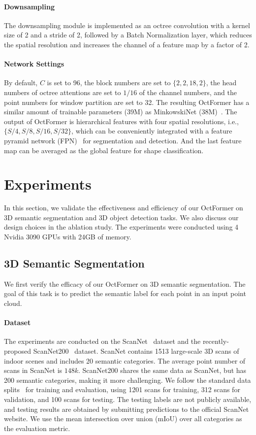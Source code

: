 \documentclass[acmtog,screen,authorversion]{acmart}
\begin{document}
\paragraph{Downsampling}
The downsampling module is implemented as an octree convolution with a kernel size of 2 and a stride of 2, followed by a Batch Normalization layer, which reduces the spatial resolution and increases the channel of a feature map by a factor of 2.

\paragraph{Network Settings}
By default, $C$ is set to 96, the block numbers are set to $\{2, 2, 18, 2\}$,  the head numbers of octree attentions are set to $1/16$ of the channel numbers, and the point numbers for window partition are set to 32.
The resulting OctFormer has a similar amount of trainable parameters (39M) as MinkowskiNet (38M)~\cite{Choy2019}.
The output of OctFormer is hierarchical features with four spatial resolutions, i.e., $\{ S/4, S/8, S/16, S/32 \}$, which can be conveniently integrated with a feature pyramid network (FPN)~\cite{Lin2017} for segmentation and detection.
And the last feature map can be averaged as the global feature for shape classification.

 \section{Experiments} \label{sec:result}
In this section, we validate the effectiveness and efficiency of our OctFormer on 3D semantic segmentation and 3D object detection tasks.
We also discuss our design choices in the ablation study.
The experiments were conducted using 4 Nvidia 3090 GPUs with 24GB of memory.

\subsection{3D Semantic Segmentation} \label{sec:segmentation}
We first verify the efficacy of our OctFormer on 3D semantic segmentation.
The goal of this task is to predict the semantic label for each point in an input point cloud.

\paragraph{Dataset}
The experiments are conducted on the ScanNet~\cite{Dai2017a} dataset and the recently-proposed ScanNet200~\cite{Rozen2022} dataset.
ScanNet contains 1513 large-scale 3D scans of indoor scenes and includes 20 semantic categories.
The average point number of scans in ScanNet is $148k$.
ScanNet200 shares the same data as ScanNet, but has 200 semantic categories, making it more challenging.
We follow the standard data splits~\cite{Dai2017a} for training and evaluation, using 1201 scans for training, 312 scans for validation, and 100 scans for testing.
The testing labels are not publicly available, and testing results are obtained by submitting predictions to the official ScanNet website.
We use the mean intersection over union (mIoU) over all categories as the evaluation metric.
\end{document}
